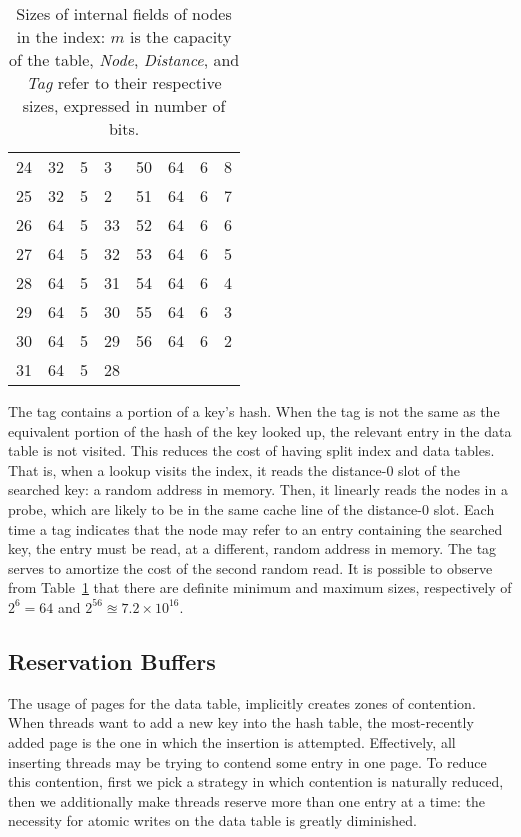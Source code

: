 \begin{table}
\begin{tabular}{llll|llll}
                  24       & 32   & 5        & 3   & 50       & 64   & 6        & 8   \\
                  25       & 32   & 5        & 2   & 51       & 64   & 6        & 7   \\
                  26       & 64   & 5        & 33  & 52       & 64   & 6        & 6   \\
                  27       & 64   & 5        & 32  & 53       & 64   & 6        & 5   \\
                  28       & 64   & 5        & 31  & 54       & 64   & 6        & 4   \\
                  29       & 64   & 5        & 30  & 55       & 64   & 6        & 3   \\
                  30       & 64   & 5        & 29  & 56       & 64   & 6        & 2   \\
                  31 & 64 & 5 & 28 & \\
    \end{tabular}
    \caption{Sizes of internal fields of nodes in the index: $m$ is the capacity of the table, \emph{Node}, \emph{Distance}, and \emph{Tag} refer to their respective sizes, expressed in number of bits.}
    \label{tab:nodes}
\end{table}

The tag contains a portion of a key's hash.
When the tag is not the same as the equivalent portion of the hash of the key looked up, the relevant entry in the data table is not visited.
This reduces the cost of having split index and data tables.
That is, when a lookup visits the index, it reads the distance-0 slot of the searched key: a random address in memory.
Then, it linearly reads the nodes in a probe, which are likely to be in the same cache line of the distance-0 slot.
Each time a tag indicates that the node may refer to an entry containing the searched key, the entry must be read, at a different, random address in memory.
The tag serves to amortize the cost of the second random read.
It is possible to observe from Table~\ref{tab:nodes} that there are definite minimum and maximum sizes, respectively of $2^{6} = 64$ and $2^{56} \approxeq 7.2 \times 10^{16}$.


\subsection{Reservation Buffers}\label{subsec:reservation-buffers}

The usage of pages for the data table, implicitly creates zones of contention.
When threads want to add a new key into the hash table, the most-recently added page is the one in which the insertion is attempted.
Effectively, all inserting threads may be trying to contend some entry in one page.
To reduce this contention, first we pick a strategy in which contention is naturally reduced, then we additionally make threads reserve more than one entry at a time: the necessity for atomic writes on the data table is greatly diminished.

